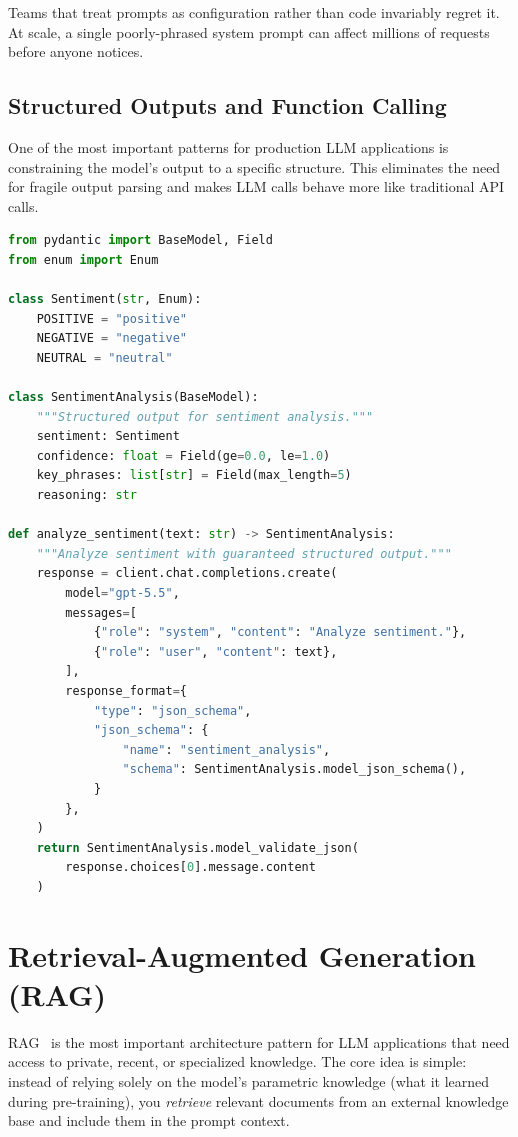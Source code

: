 Teams that treat prompts as configuration rather than code invariably regret it. At scale, a single poorly-phrased system prompt can affect millions of requests before anyone notices.


\subsection{Structured Outputs and Function Calling}

One of the most important patterns for production LLM applications is constraining the model's output to a specific structure. This eliminates the need for fragile output parsing and makes LLM calls behave more like traditional API calls.

\begin{lstlisting}[language=Python, caption={Structured output with Pydantic validation}]
from pydantic import BaseModel, Field
from enum import Enum

class Sentiment(str, Enum):
    POSITIVE = "positive"
    NEGATIVE = "negative"
    NEUTRAL = "neutral"

class SentimentAnalysis(BaseModel):
    """Structured output for sentiment analysis."""
    sentiment: Sentiment
    confidence: float = Field(ge=0.0, le=1.0)
    key_phrases: list[str] = Field(max_length=5)
    reasoning: str

def analyze_sentiment(text: str) -> SentimentAnalysis:
    """Analyze sentiment with guaranteed structured output."""
    response = client.chat.completions.create(
        model="gpt-5.5",
        messages=[
            {"role": "system", "content": "Analyze sentiment."},
            {"role": "user", "content": text},
        ],
        response_format={
            "type": "json_schema",
            "json_schema": {
                "name": "sentiment_analysis",
                "schema": SentimentAnalysis.model_json_schema(),
            }
        },
    )
    return SentimentAnalysis.model_validate_json(
        response.choices[0].message.content
    )
\end{lstlisting}

\section{Retrieval-Augmented Generation (RAG)}
\label{sec:rag}

RAG~\cite{lewis2020rag} is the most important architecture pattern for LLM applications that need access to private, recent, or specialized knowledge. The core idea is simple: instead of relying solely on the model's parametric knowledge (what it learned during pre-training), you \emph{retrieve} relevant documents from an external knowledge base and include them in the prompt context.


